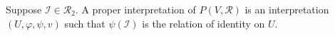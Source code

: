 Suppose $\mathcal{I} \in \mathcal{R}_2$. A proper interpretation of $P(V, \mathcal{R})$ is an interpretation $(U, \varphi, \psi, v)$ such that $\psi(\mathcal{I})$ is the relation of identity on $U$.

